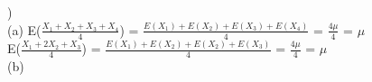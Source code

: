 \documentclass[12pt]{article}
\begin{document}
\noindent \hrulefill 


)\\
\indent (a) E({\Large{$\frac{X_1+X_2+X_3+X_4}{4}$}) = $\frac{E(X_1)+E(X_2)+E(X_3)+E(X_4)}{4}$} = {\Large $\frac{4\mu}{4}$} = $\mu$\\[.4em]
\indent \indent E({\Large{$\frac{X_1+2X_2+X_3}{4}$}) = $\frac{E(X_1)+E(X_2)+E(X_2)+E(X_3)}{4}$} = {\Large $\frac{4\mu}{4}$} = $\mu$\\[.4em]

\indent (b) 
\end{document}
